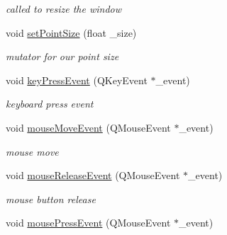 \begin{DoxyCompactItemize}
\begin{DoxyCompactList}\small\item\em called to resize the window \end{DoxyCompactList}\item 
\hypertarget{class_open_g_l_widget_a4f3770bd262b22162296fd49e45fbafd}{void \hyperlink{class_open_g_l_widget_a4f3770bd262b22162296fd49e45fbafd}{set\-Point\-Size} (float \-\_\-size)}\label{class_open_g_l_widget_a4f3770bd262b22162296fd49e45fbafd}

\begin{DoxyCompactList}\small\item\em mutator for our point size \end{DoxyCompactList}\item 
\hypertarget{class_open_g_l_widget_a2e7ec0372fb6b2a0eb85a9524cfdd7fd}{void \hyperlink{class_open_g_l_widget_a2e7ec0372fb6b2a0eb85a9524cfdd7fd}{key\-Press\-Event} (Q\-Key\-Event $\ast$\-\_\-event)}\label{class_open_g_l_widget_a2e7ec0372fb6b2a0eb85a9524cfdd7fd}

\begin{DoxyCompactList}\small\item\em keyboard press event \end{DoxyCompactList}\item 
\hypertarget{class_open_g_l_widget_aa6d543f552c813df3b3a78dc5c4899fd}{void \hyperlink{class_open_g_l_widget_aa6d543f552c813df3b3a78dc5c4899fd}{mouse\-Move\-Event} (Q\-Mouse\-Event $\ast$\-\_\-event)}\label{class_open_g_l_widget_aa6d543f552c813df3b3a78dc5c4899fd}

\begin{DoxyCompactList}\small\item\em mouse move \end{DoxyCompactList}\item 
\hypertarget{class_open_g_l_widget_aa3f5541e5da2d5c52ca16b99f40dfd75}{void \hyperlink{class_open_g_l_widget_aa3f5541e5da2d5c52ca16b99f40dfd75}{mouse\-Release\-Event} (Q\-Mouse\-Event $\ast$\-\_\-event)}\label{class_open_g_l_widget_aa3f5541e5da2d5c52ca16b99f40dfd75}

\begin{DoxyCompactList}\small\item\em mouse button release \end{DoxyCompactList}\item 
\hypertarget{class_open_g_l_widget_adaab83f0bed689b0765d42b6ae760220}{void \hyperlink{class_open_g_l_widget_adaab83f0bed689b0765d42b6ae760220}{mouse\-Press\-Event} (Q\-Mouse\-Event $\ast$\-\_\-event)}\label{class_open_g_l_widget_adaab83f0bed689b0765d42b6ae760220}


\end{DoxyCompactItemize}
